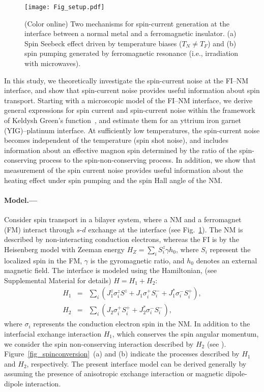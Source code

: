 \documentclass[aps,prl,reprint,showpacs]{revtex4-1}
\begin{document}
\begin{figure}[!tb]
\begin{center}
\texttt{[image: Fig\_setup.pdf]}
\caption{(Color online) Two mechanisms for spin-current generation at the interface between a normal metal and a ferromagnetic insulator. (a) Spin Seebeck effect driven by temperature biases ($T_N \ne T_F$) and (b) spin pumping generated by ferromagnetic resonance (i.e., irradiation with microwaves). }
\label{fig_setup}
\end{center}
\end{figure}

In this study, we theoretically investigate the spin-current noise at the FI--NM interface, and
show that spin-current noise provides useful information about spin transport.
Starting with a microscopic model of the FI--NM interface, we derive general expressions for spin current and spin-current noise within the framework of Keldysh Green's function~\cite{Haug-text}, and estimate them for an yttrium iron garnet (YIG)--platinum interface.
At sufficiently low temperatures, the spin-current noise becomes independent of the temperature (spin shot noise), and includes information about an effective magnon spin determined by the ratio of the spin-conserving process to the spin-non-conserving process.
In addition, we show that measurement of the spin current noise provides useful information about the heating effect under spin pumping 
and the spin Hall angle of the NM.

\paragraph{Model.---}
Consider spin transport in a bilayer system, where a NM and a ferromagnet (FM)  interact through $s$-$d$ exchange at the interface (see Fig.~\ref{fig_setup}). 
The NM is described by non-interacting conduction electrons, whereas the FI is by the Heisenberg model with Zeeman energy $H_Z=\sum_i S_i^z \gamma h_0$, where $S_i$ represent the localized spin in the FM,
$\gamma$ is the gyromagnetic ratio, and $h_0$ denotes an external magnetic field.
The interface is modeled using the Hamiltonian,  (see Supplemental Material for details)
$H = H_1 + H_2 $:
\begin{eqnarray}
H_1 &=& \sum_i (J^z_1\sigma^z_i S^z + J_1\sigma^+_i S^-_i  + J_1^*\sigma^-_i S^+_i), \\
H_2 &=& \sum_i (J_2\sigma^+_i S^+_i  + J_2^*\sigma^-_i S^-_i),
\end{eqnarray}
where $\sigma_i$ represents the conduction electron spin in the NM.
In addition to the interfacial exchange interaction $H_1$, which conserves the spin angular momentum, we consider the spin non-conserving interaction described by $H_2$ (see ).
Figure~\ref{fig_spinconversion}~(a) and (b) indicate the processes described by $H_1$ and $H_2$, respectively. 
The present interface model can be derived generally by assuming the presence of anisotropic exchange interaction or magnetic dipole-dipole interaction. 
\end{document}
